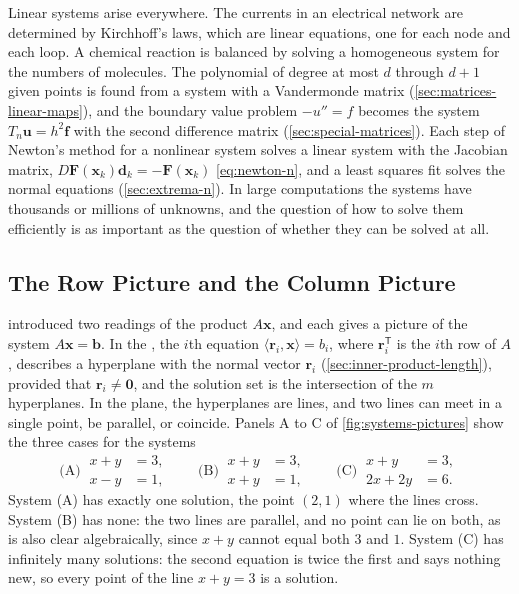 Linear systems arise everywhere. The currents in an electrical network are determined by Kirchhoff's laws, which are linear equations, one for each node and each loop. A chemical reaction is balanced by solving a homogeneous system for the numbers of molecules. The polynomial of degree at most $d$ through $d+1$ given points is found from a system with a Vandermonde matrix (\cref{sec:matrices-linear-maps}), and the boundary value problem $-u''=f$ becomes the system $T_n\mathbf u=h^2\mathbf f$ with the second difference matrix (\cref{sec:special-matrices}). Each step of Newton's method for a nonlinear system solves a linear system with the Jacobian matrix, $D\mathbf F(\mathbf x_k)\mathbf d_k=-\mathbf F(\mathbf x_k)$ \eqref{eq:newton-n}, and a least squares fit solves the normal equations (\cref{sec:extrema-n}). In large computations the systems have thousands or millions of unknowns, and the question of how to solve them efficiently is as important as the question of whether they can be solved at all.

\subsection{The Row Picture and the Column Picture}

 introduced two readings of the product $A\mathbf x$, and each gives a picture of the system $A\mathbf x=\mathbf b$. In the , the $i$th equation $\langle\mathbf r_i,\mathbf x\rangle=b_i$, where $\mathbf r_i^{\mathsf T}$ is the $i$th row of $A$, describes a hyperplane with the normal vector $\mathbf r_i$ (\cref{sec:inner-product-length}), provided that $\mathbf r_i\ne\mathbf 0$, and the solution set is the intersection of the $m$ hyperplanes. In the plane, the hyperplanes are lines, and two lines can meet in a single point, be parallel, or coincide. Panels A to C of \cref{fig:systems-pictures} show the three cases for the systems
\begin{equation}
\text{(A)}\ \begin{aligned}x+y&=3,\\x-y&=1,\end{aligned}\qquad
\text{(B)}\ \begin{aligned}x+y&=3,\\x+y&=1,\end{aligned}\qquad
\text{(C)}\ \begin{aligned}x+y&=3,\\2x+2y&=6.\end{aligned}
\label{eq:three-cases}
\end{equation}
System (A) has exactly one solution, the point $(2,1)$ where the lines cross. System (B) has none: the two lines are parallel, and no point can lie on both, as is also clear algebraically, since $x+y$ cannot equal both $3$ and $1$. System (C) has infinitely many solutions: the second equation is twice the first and says nothing new, so every point of the line $x+y=3$ is a solution.

